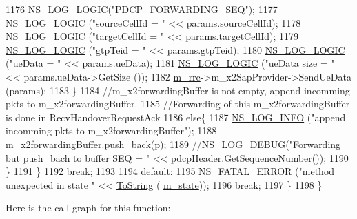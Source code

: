 \begin{DoxyCode}
1176           \hyperlink{group__logging_ga88acd260151caf2db9c0fc84997f45ce}{NS\_LOG\_LOGIC}(\textcolor{stringliteral}{"PDCP\_FORWARDING\_SEQ"});
1177           \hyperlink{group__logging_ga88acd260151caf2db9c0fc84997f45ce}{NS\_LOG\_LOGIC} (\textcolor{stringliteral}{"sourceCellId = "} << params.sourceCellId);
1178           \hyperlink{group__logging_ga88acd260151caf2db9c0fc84997f45ce}{NS\_LOG\_LOGIC} (\textcolor{stringliteral}{"targetCellId = "} << params.targetCellId);
1179           \hyperlink{group__logging_ga88acd260151caf2db9c0fc84997f45ce}{NS\_LOG\_LOGIC} (\textcolor{stringliteral}{"gtpTeid = "} << params.gtpTeid);
1180           \hyperlink{group__logging_ga88acd260151caf2db9c0fc84997f45ce}{NS\_LOG\_LOGIC} (\textcolor{stringliteral}{"ueData = "} << params.ueData);
1181           \hyperlink{group__logging_ga88acd260151caf2db9c0fc84997f45ce}{NS\_LOG\_LOGIC} (\textcolor{stringliteral}{"ueData size = "} << params.ueData->GetSize ());
1182           \hyperlink{classns3_1_1UeManager_ab4405e9f354c66e7c1a4c95832290f5b}{m\_rrc}->m\_x2SapProvider->SendUeData (params);
1183         \}
1184         \textcolor{comment}{//m\_x2forwardingBuffer is not empty, append incomming pkts to m\_x2forwardingBuffer.}
1185         \textcolor{comment}{//Forwarding of this m\_x2forwardingBuffer is done in RecvHandoverRequestAck}
1186         \textcolor{keywordflow}{else}\{
1187           \hyperlink{group__logging_gafbd73ee2cf9f26b319f49086d8e860fb}{NS\_LOG\_INFO} (\textcolor{stringliteral}{"append incomming pkts to m\_x2forwardingBuffer"});
1188           \hyperlink{classns3_1_1UeManager_a3fb8a9dc6ef434306f90f42837f3ae83}{m\_x2forwardingBuffer}.push\_back(p);
1189           \textcolor{comment}{//NS\_LOG\_DEBUG("Forwarding but push\_bach to buffer SEQ = " << pdcpHeader.GetSequenceNumber());}
1190         \}
1191       \}
1192       \textcolor{keywordflow}{break};
1193 
1194     \textcolor{keywordflow}{default}:
1195       \hyperlink{group__fatal_ga5131d5e3f75d7d4cbfd706ac456fdc85}{NS\_FATAL\_ERROR} (\textcolor{stringliteral}{"method unexpected in state "} << \hyperlink{namespacens3_a3d1f7e1bec1972e2ae8d64673fcfcd9c}{ToString} (
      \hyperlink{classns3_1_1UeManager_aaed4b2490297cb912e743084f1a27b08}{m\_state}));
1196       \textcolor{keywordflow}{break};
1197     \}
1198 \}
\end{DoxyCode}


Here is the call graph for this function\+:


